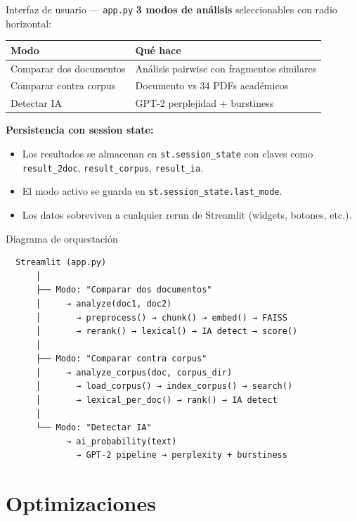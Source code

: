 \documentclass[aspectratio=169]{beamer}
\begin{document}
\begin{frame}{Interfaz de usuario — \texttt{app.py}}
  \textbf{3 modos de análisis} seleccionables con radio horizontal:
  \vspace{0.5em}
  \begin{center}
    \begin{tabular}{lp{8cm}}
      \textbf{Modo} & \textbf{Qué hace} \\
      \hline
      Comparar dos documentos & Análisis pairwise con fragmentos similares \\
      Comparar contra corpus  & Documento vs 34 PDFs académicos \\
      Detectar IA            & GPT-2 perplejidad + burstiness \\
    \end{tabular}
  \end{center}
  \vspace{1em}
  \textbf{Persistencia con session state:}
  \begin{itemize}
    \item Los resultados se almacenan en \texttt{st.session\_state} con claves como \texttt{result\_2doc}, \texttt{result\_corpus}, \texttt{result\_ia}.
    \item El modo activo se guarda en \texttt{st.session\_state.last\_mode}.
    \item Los datos sobreviven a cualquier rerun de Streamlit (widgets, botones, etc.).
  \end{itemize}
\end{frame}

\begin{frame}{Diagrama de orquestación}
  \centering
  \footnotesize
  \begin{verbatim}
  Streamlit (app.py)
      │
      ├── Modo: "Comparar dos documentos"
      │     → analyze(doc1, doc2)
      │       → preprocess() → chunk() → embed() → FAISS
      │       → rerank() → lexical() → IA detect → score()
      │
      ├── Modo: "Comparar contra corpus"
      │     → analyze_corpus(doc, corpus_dir)
      │       → load_corpus() → index_corpus() → search()
      │       → lexical_per_doc() → rank() → IA detect
      │
      └── Modo: "Detectar IA"
            → ai_probability(text)
              → GPT-2 pipeline → perplexity + burstiness
  \end{verbatim}
\end{frame}

\section{Optimizaciones}
\end{document}
